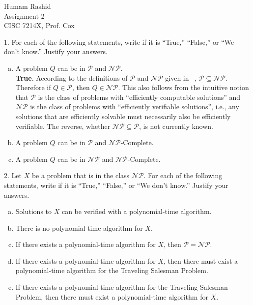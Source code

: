 \documentclass{scrartcl}
\begin{document}
\begin{flushleft}

    Humam Rashid\\
    Assignment 2\\
    CISC 7214X, Prof. Cox\\
    \bigskip

    1. For each of the following statements, write if it is ``True,'' ``False,'' or ``We don't
    know.'' Justify your answers.\\
    \begin{enumerate}[(a)]
        \item A problem $Q$ can be in $\mathcal{P}$ and $\mathcal{NP}$.\\
            \medskip
            \textbf{True}. According to the definitions of $\mathcal{P}$ and $\mathcal{NP}$ given in
            ~\cite{modernapp}, $\mathcal{P} \subseteq \mathcal{NP}$. Therefore if $Q \in
            \mathcal{P}$, then $Q \in \mathcal{NP}$. This also follows from the intuitive notion
            that $\mathcal{P}$ is the class of problems with ``efficiently computable solutions''
            and $\mathcal{NP}$ is the class of problems with ``efficiently verifiable solutions'',
            i.e., any solutions that are efficiently solvable must necessarily also be efficiently
            verifiable. The reverse, whether $\mathcal{NP} \subseteq \mathcal{P}$, is not currently
            known.
        \item A problem $Q$ can be in $\mathcal{P}$ and $\mathcal{NP}$-Complete.
        \item A problem $Q$ can be in $\mathcal{NP}$ and $\mathcal{NP}$-Complete.
    \end{enumerate}
    2. Let $X$ be a problem that is in the class $\mathcal{NP}$. For each of the following
    statements, write if it is ``True,'' ``False,'' or ``We don't know.'' Justify your answers.\\
    \begin{enumerate}[(a)]
        \item Solutions to $X$ can be verified with a polynomial-time algorithm.
        \item There is no polynomial-time algorithm for $X$.
        \item If there exists a polynomial-time algorithm for $X$, then $\mathcal{P} =
            \mathcal{NP}$.
        \item If there exists a polynomial-time algorithm for $X$, then there must exist a
            polynomial-time algorithm for the Traveling Salesman Problem.
        \item If there exists a polynomial-time algorithm for the Traveling Salesman Problem, then
            there must exist a polynomial-time algorithm for $X$.
    \end{enumerate}

    
    
\end{flushleft}
\end{document}
